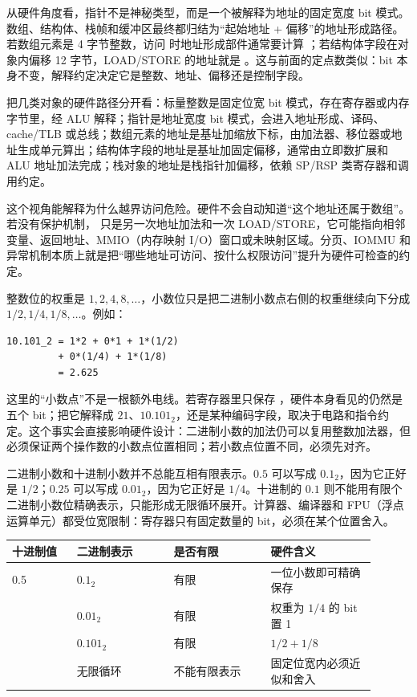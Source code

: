 从硬件角度看，指针不是神秘类型，而是一个被解释为地址的固定宽度 bit 模式。数组、结构体、栈帧和缓冲区最终都归结为“起始地址 + 偏移”的地址形成路径。若数组元素是 4 字节整数，访问  时地址形成部件通常要计算 ；若结构体字段在对象内偏移 12 字节，LOAD/STORE 的地址就是 。这与前面的定点数类似：bit 本身不变，解释约定决定它是整数、地址、偏移还是控制字段。

把几类对象的硬件路径分开看：标量整数是固定位宽 bit 模式，存在寄存器或内存字节里，经 ALU 解释；指针是地址宽度 bit 模式，会进入地址形成、译码、cache/TLB 或总线；数组元素的地址是基址加缩放下标，由加法器、移位器或地址生成单元算出；结构体字段的地址是基址加固定偏移，通常由立即数扩展和 ALU 地址加法完成；栈对象的地址是栈指针加偏移，依赖 SP/RSP 类寄存器和调用约定。

这个视角能解释为什么越界访问危险。硬件不会自动知道“这个地址还属于数组”。若没有保护机制， 只是另一次地址加法和一次 LOAD/STORE，它可能指向相邻变量、返回地址、MMIO（内存映射 I/O）窗口或未映射区域。分页、IOMMU 和异常机制本质上就是把“哪些地址可访问、按什么权限访问”提升为硬件可检查的约定。

整数位的权重是 $1,2,4,8,\ldots$，小数位只是把二进制小数点右侧的权重继续向下分成 $1/2,1/4,1/8,\ldots$。例如：

\begin{lstlisting}
10.101_2 = 1*2 + 0*1 + 1*(1/2)
         + 0*(1/4) + 1*(1/8)
         = 2.625
\end{lstlisting}

这里的“小数点”不是一根额外电线。若寄存器里只保存 ，硬件本身看见的仍然是五个 bit；把它解释成 $21$、$10.101_2$，还是某种编码字段，取决于电路和指令约定。这个事实会直接影响硬件设计：二进制小数的加法仍可以复用整数加法器，但必须保证两个操作数的小数点位置相同；若小数点位置不同，必须先对齐。

二进制小数和十进制小数并不总能互相有限表示。$0.5$ 可以写成 $0.1_2$，因为它正好是 $1/2$；$0.25$ 可以写成 $0.01_2$，因为它正好是 $1/4$。十进制的 $0.1$ 则不能用有限个二进制小数位精确表示，只能形成无限循环展开。计算器、编译器和 FPU（浮点运算单元）都受位宽限制：寄存器只有固定数量的 bit，必须在某个位置舍入。

\begin{longtable}{L{0.16\linewidth}L{0.24\linewidth}L{0.24\linewidth}L{0.26\linewidth}}
\toprule
十进制值 & 二进制表示 & 是否有限 & 硬件含义 \\
 & $0.1_2$ & 有限 & 一位小数即可精确保存 \\ & $0.01_2$ & 有限 & 权重为 $1/4$ 的 bit 置 1 \\ & $0.101_2$ & 有限 & $1/2+1/8$ \\ & 无限循环 & 不能有限表示 & 固定位宽内必须近似和舍入 \\
\bottomrule
\end{longtable}

